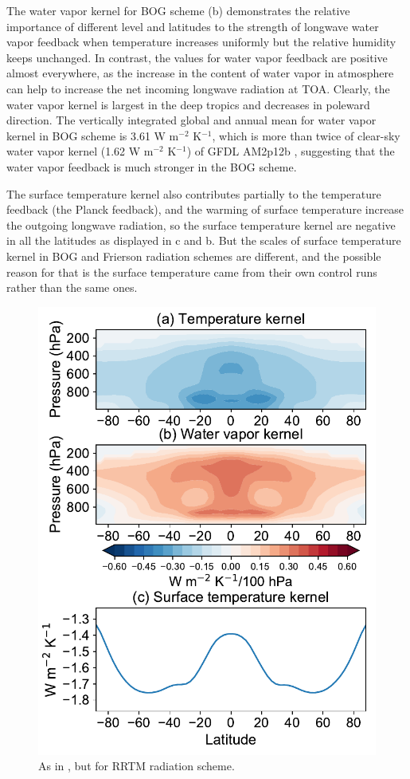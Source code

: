 The water vapor kernel for BOG scheme (b) demonstrates the relative importance of different level and latitudes to the strength of longwave water vapor feedback when temperature increases uniformly but the relative humidity keeps unchanged. In contrast, the values for water vapor feedback are positive almost everywhere, as the increase in the content of water vapor in atmosphere can help to increase the net incoming longwave radiation at TOA. Clearly, the water vapor kernel is largest in the deep tropics and decreases in poleward direction. The vertically integrated global and annual mean for water vapor kernel in BOG scheme is 3.61 W m$^{-2}$ K$^{-1}$, which is more than twice of clear-sky water vapor kernel (1.62 W m$^{-2}$ K$^{-1}$) of GFDL AM2p12b \citep{Soden2008}, suggesting that the water vapor feedback is much stronger in the BOG scheme.

The surface temperature kernel also contributes partially to the temperature feedback (the Planck feedback), and the warming of surface temperature increase the outgoing longwave radiation, so the surface temperature kernel are negative in all the latitudes as displayed in c and b. But the scales of surface temperature kernel in BOG and Frierson radiation schemes are different, and the possible reason for that is the surface temperature came from their own control runs rather than the same ones.

\begin{figure}[tbhp]
	\centering
	\includegraphics[width=.6\linewidth]{figs/polar_amp/kernels_rrtm}
	\caption{As in , but for RRTM radiation scheme.}
	\label{fig:rrtm_kernels}
\end{figure}

